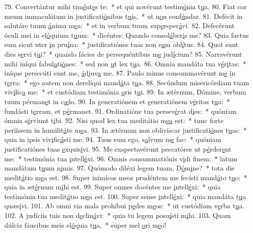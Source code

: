 79. Convertántur mihi tim\uline{é}nt\uline{e}s te:~* et qui novérunt testim\uline{ó}nia t\uline{u}a.
80. Fiat cor meum immaculátum in justificati\uline{ó}nibus t\uline{u}is,~* ut n\uline{o}n conf\uline{ú}ndar.
81. Defécit in salutáre tuum \uline{á}nima m\uline{e}a:~* et in verbum tuum sup\uline{e}rsper\uline{á}vi.
82. Defecérunt óculi mei in el\uline{ó}quium t\uline{u}um:~* dicéntes: Quando consol\uline{á}ber\uline{i}s me?
83. Quia factus sum sicut uter \uline{i}n pru\uline{í}na:~* justificatiónes tuas non s\uline{u}m obl\uline{í}tus.
84. Quot sunt dies s\uline{e}rvi t\uline{u}i?~* quando fácies de persequéntibus m\uline{e} jud\uline{í}cium?
85. Narravérunt mihi iníqui fabul\uline{a}ti\uline{ó}nes:~* sed non \uline{u}t lex t\uline{u}a.
86. Omnia mandáta tua v\uline{é}r\uline{i}tas:~* iníque persecúti sunt me, \uline{á}djuv\uline{a} me.
87. Paulo minus consummavérunt m\uline{e} in t\uline{e}rra:~* ego autem non derelíqui mand\uline{á}ta t\uline{u}a.
88. Secúndum misericórdiam tuam viv\uline{í}fic\uline{a} me:~* et custódiam testimónia \uline{o}ris t\uline{u}i.
89. In ætérnum, Dómine, verbum tuum pérman\uline{e}t in c\uline{æ}lo.
90. In generatiónem et generatiónem v\uline{é}ritas t\uline{u}a:~* fundásti t\uline{e}rram, et p\uline{é}rmanet.
91. Ordinatióne tua persev\uline{é}rat d\uline{i}es:~* quóniam ómnia s\uline{é}rviunt t\uline{i}bi.
92. Nisi quod lex tua meditátio m\uline{e}\uline{a} est:~* tunc forte periíssem in humilit\uline{á}te m\uline{e}a.
93. In ætérnum non oblivíscar justificati\uline{ó}nes t\uline{u}as:~* quia in ipsis viv\uline{i}fic\uline{á}sti me.
94. Tuus sum ego, s\uline{a}lvum m\uline{e} fac:~* quóniam justificatiónes tuas \uline{e}xquis\uline{í}vi.
95. Me exspectavérunt peccatóres ut p\uline{é}rder\uline{e}nt me:~* testimónia tua \uline{i}ntell\uline{é}xi.
96. Omnis consummatiónis v\uline{i}di f\uline{i}nem:~* latum mandátum t\uline{u}um n\uline{i}mis.
97. Quómodo diléxi legem tuam, D\uline{ó}m\uline{i}ne?~* tota die medit\uline{á}tio m\uline{e}a est.
98. Super inimícos meos prudéntem me fecísti mand\uline{á}to t\uline{u}o:~* quia in æt\uline{é}rnum m\uline{i}hi est.
99. Super omnes docéntes me \uline{i}ntell\uline{é}xi:~* quia testimónia tua medit\uline{á}tio m\uline{e}a est.
100. Super senes \uline{i}ntell\uline{é}xi:~* quia mandáta t\uline{u}a quæs\uline{í}vi.
101. Ab omni via mala prohíbui p\uline{e}des m\uline{e}os:~* ut custódiam v\uline{e}rba t\uline{u}a.
102. A judíciis tuis non d\uline{e}clin\uline{á}vi:~* quia tu legem posu\uline{í}sti m\uline{i}hi.
103. Quam dúlcia fáucibus meis el\uline{ó}quia t\uline{u}a,~* super mel \uline{o}ri m\uline{e}o!
